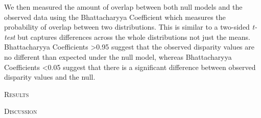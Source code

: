 \documentclass[12pt,letterpaper]{article}
\renewcommand{\section}[1]{%
\bigskip
\begin{center}
\begin{Large}
\normalfont\scshape #1
\medskip
\end{Large}
\end{center}}
\begin{document}
We then measured the amount of overlap between both null models
and the observed data using the Bhattacharyya Coefficient \citep{Bhattacharyya} which measures the probability of overlap between two distributions. 
This is similar to a two-sided \textit{t-test} but captures differences across the whole distributions not just the means. %
Bhattacharyya Coefficients \textgreater 0.95 suggest that the observed disparity values are no different than expected under the null model, whereas Bhattacharyya Coefficients \textless 0.05 suggest that there is a significant difference between observed disparity values and the null.

%
%

\section{Results}

%
%

\section{Discussion}

\end{document}
